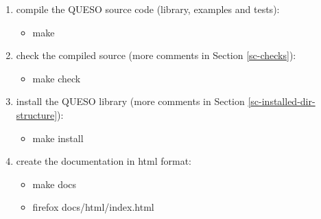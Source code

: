\begin{enumerate}
{}
\item {compile the QUESO source code (library, examples and tests): %
\begin{itemize}
\item make
\end{itemize}
}
\item {check the compiled source (more comments in Section \ref{sc-checks}): %
\begin{itemize}
\item make check
\end{itemize}
}
\item {install the QUESO library (more comments in Section \ref{sc-installed-dir-structure}): %
\begin{itemize}
\item make install
\end{itemize}
}
\item {create the documentation in html format: %
\begin{itemize}
\item make docs
\item firefox docs/html/index.html
\end{itemize}
}
\end{enumerate}


